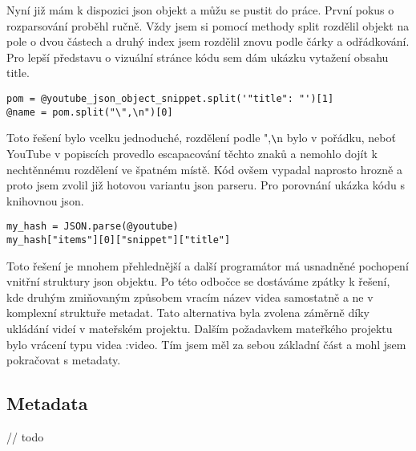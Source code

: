 \par Nyní již mám k dispozici json objekt a můžu se pustit do práce. První pokus o rozparsování proběhl ručně. Vždy jsem si pomocí methody split rozdělil objekt na pole o dvou částech a druhý index jsem rozdělil znovu podle čárky a odřádkování. Pro lepší představu o vizuální stránce kódu sem dám ukázku vytažení obsahu title.
\begin{verbatim}
pom = @youtube_json_object_snippet.split('"title": "')[1]
@name = pom.split("\",\n")[0]
\end{verbatim}
\par Toto řešení bylo vcelku jednoduché, rozdělení podle ",\verb|\|n bylo v pořádku, neboť YouTube v popiscích provedlo escapacování těchto znaků a nemohlo dojít k nechtěnnému rozdělení ve špatném místě. Kód ovšem vypadal naprosto hrozně a proto jsem zvolil již hotovou variantu json parseru. Pro porovnání ukázka kódu s knihovnou json.
\begin{verbatim}
my_hash = JSON.parse(@youtube)
my_hash["items"][0]["snippet"]["title"]
\end{verbatim}

\par Toto řešení je mnohem přehlednější a další programátor má usnadněné pochopení vnitřní struktury json objektu. Po této odbočce se dostáváme zpátky k řešení, kde druhým zmiňovaným způsobem vracím název videa samostatně a ne v komplexní struktuře metadat. Tato alternativa byla zvolena záměrně díky ukládání videí v mateřském projektu. Dalším požadavkem mateřkého projektu bylo vrácení typu videa :video. Tím jsem měl za sebou základní část a mohl jsem pokračovat s metadaty.


\subsection{Metadata}

\par // todo